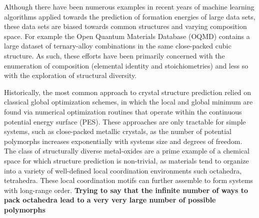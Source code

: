 %
%
Although there have been numerous examples in recent years of machine learning algorithms applied towards the prediction of formation energies of large  data sets,
these data sets are biased towards common structures and varying composition space.
%
For example the Open Quantum Materials Database (OQMD) contains a large dataset of ternary-alloy combinations in the same close-packed cubic structure.\cite{Kirklin2015}
%
As such, these efforts have been primarily concerned with the enumeration of composition (elemental identity and stoichiometries) and less so with the exploration of structural diversity.
%


%
%
Historically, the most common approach to crystal structure prediction relied on classical global optimization schemes,
in which the local and global minimum are found via numerical optimization routines that operate within the continuous potential energy surface (PES).
%
These approaches are only tractable for simple systems, such as close-packed metallic crystals,
as the number of potential polymorphs increases exponentially with systems size and degrees of freedom.\cite{Stillinger1999}
%
The class of structurally diverse metal-oxides are a prime example of a chemical space for which structure prediction is non-trivial, as materials tend to organize into a variety of well-defined local coordination environments such octahedra, tetrahedra.
%
These local coordination motifs can further assemble to form systems with long-range order.
\textbf{Trying to say that the infinite number of ways to pack octahedra lead to a very very large number of possible polymorphs}


